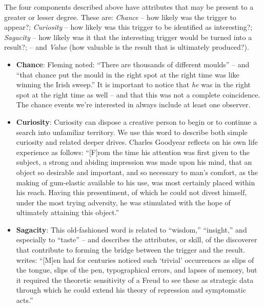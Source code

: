 The four components described above have attributes that may be present to a greater or lesser degree.  These are: \emph{Chance} -- how likely was the trigger to appear?; \emph{Curiosity} -- how likely was this trigger to be identified as interesting?; \emph{Sagacity} -- how likely was it that the interesting trigger would be turned into a result?; -- and \emph{Value} (how valuable is the result that is ultimately produced?).

\begin{itemize}
\item \textbf{Chance}: Fleming \citeyear{fleming} noted: ``There are
  thousands of different moulds'' -- and ``that chance put the mould
  in the right spot at the right time was like winning the Irish
  sweep.''  It is important to notice that \emph{he} was in the right
  spot at the right time as well -- and that this was not a complete
  coincidence.  The chance events we're interested in always include
  at least one observer.
\end{itemize}

\begin{itemize}
\item \textbf{Curiosity}: Curiosity can dispose a creative person to
  begin or to continue a search into unfamiliar territory.  We use
  this word to describe both simple curiosity and related deeper
  drives.  Charles Goodyear \citeyear{goodyear1855gum} reflects on his
  own life experience as follows: ``[F]rom the time his attention was first given
  to the subject, a strong and abiding impression was made upon his
  mind, that an object so desirable and important, and so necessary to
  man's comfort, as the making of gum-elastic available to his use,
  was most certainly placed within his reach.  Having this
  presentiment, of which he could not divest himself, under the most
  trying adversity, he was stimulated with the hope of ultimately
  attaining this object.''
\end{itemize}

\begin{itemize}
\item \textbf{Sagacity}: This old-fashioned word is related to
  ``wisdom,'' ``insight,'' and especially to ``taste'' -- and
  describes the attributes, or skill, of the discoverer that
  contribute to forming the bridge between the trigger and the result.
   writes: ``{[}M{]}en had for centuries
  noticed such `trivial' occurrences as slips of the tongue, slips of
  the pen, typographical errors, and lapses of memory, but it required
  the theoretic sensitivity of a Freud to see these as strategic data
  through which he could extend his theory of repression and
  symptomatic acts.''
\end{itemize}


